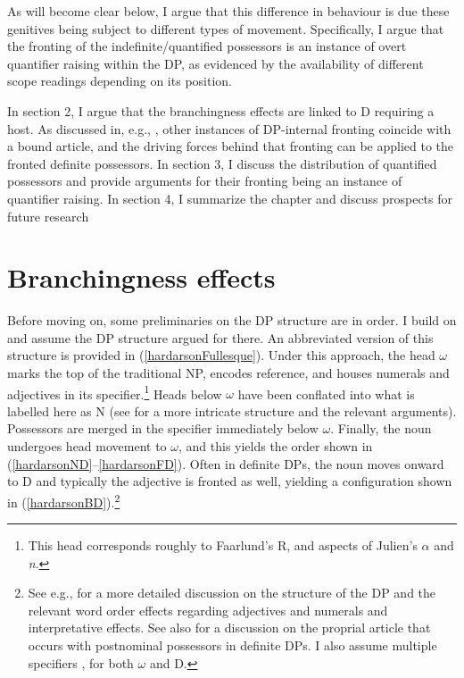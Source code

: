 \documentclass[output=paper,colorlinks,citecolor=brown,
]{langscibook}
\begin{document}
As will become clear below, I argue that this difference in behaviour is due these genitives being subject to different types of movement. Specifically, I argue that the fronting of the indefinite/quantified possessors is an instance of overt quantifier raising within the DP, as evidenced by the availability of different scope readings depending on its position.

In section 2, I argue that the branchingness effects are linked to D requiring a host. As discussed in, e.g., \cite{Hardarson:2016wd}, other instances of DP-internal fronting coincide with a bound article, and the driving forces behind that fronting can be applied to the fronted definite possessors. In section 3, I discuss the distribution of quantified possessors and provide arguments for their fronting being an instance of quantifier raising. In section 4, I summarize the chapter and discuss prospects for future research

\section{Branchingness effects}
\label{hardarsonsec:branches}

Before moving on, some preliminaries on the DP structure are in order. I build on \cite{Hardarson:2016wd} and assume the DP structure argued for there. An abbreviated version of this structure is provided in (\ref{hardarsonFullesque}). Under this approach, the head $\omega$ marks the top of the traditional NP, encodes reference, and houses numerals and adjectives in its specifier.\footnote{This head corresponds roughly to Faarlund's \citeyearpar{Faarlund:2004,Faarlund:2009tq} R, and aspects of Julien's \citeyearpar{Julien:2003wu,Julien:2005wh} $\alpha$ and \textit{n}.} Heads below $\omega$ have been conflated into what is labelled here as N (see \citealt{Hardarson:2016wd} for a more intricate structure and the relevant arguments). Possessors are merged in the specifier immediately below $\omega$. Finally, the noun undergoes head movement to $\omega$, and this yields the order shown in (\ref{hardarsonND}--\ref{hardarsonFD}). Often in definite DPs, the noun moves onward to D and typically the adjective is fronted as well, yielding a configuration shown in (\ref{hardarsonBD}).\footnote{See e.g., \citep{Magnusson:1984ue,HAS:1993,Sigurdsson:2006wn,Pfaff:2015tp,Ingason:2016wv,Hardarson:2016wd} for a more detailed discussion on the structure of the DP and the relevant word order effects regarding adjectives and numerals and interpretative effects. See also \cite{Sigurdsson:2006wn} for a discussion on the proprial article that occurs with postnominal possessors in definite DPs. I also assume multiple specifiers \citep[e.g.,][]{Chomsky:1995uq,Lahne:2009va}, for both $\omega$ and D.}
\end{document}
